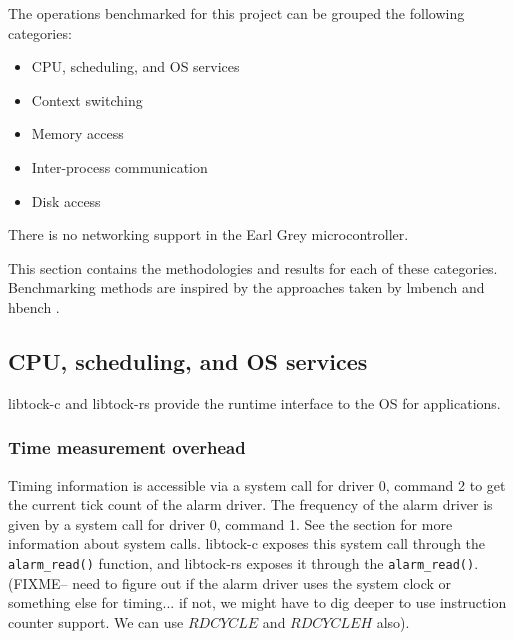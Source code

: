 \documentclass{article}
\begin{document}
The operations benchmarked for this project can be grouped the following categories:

\begin{itemize}
    \item CPU, scheduling, and OS services
    \item Context switching
    \item Memory access
    \item Inter-process communication
    \item Disk access
\end{itemize}

There is no networking support in the Earl Grey microcontroller.

This section contains the methodologies and results for each of these categories. Benchmarking methods are inspired by the approaches taken by lmbench \cite{lmbench} and hbench \cite{hbench}.


\subsection{CPU, scheduling, and OS services}

libtock-c and libtock-rs provide the runtime interface to the OS for applications. 

\subsubsection{Time measurement overhead} \label{subsubsec:time-measurement}

Timing information is accessible via a system call for driver 0, command 2 to get the current tick count of the alarm driver. The frequency of the alarm driver is given by a system call for driver 0, command 1. See the  section for more information about system calls. libtock-c exposes this system call through the \texttt{alarm\_read()} function, and libtock-rs exposes it through the \texttt{alarm\_read()}. (FIXME-- need to figure out if the alarm driver uses the system clock or something else for timing... if not, we might have to dig deeper to use instruction counter support. We can use $RDCYCLE$ and $RDCYCLEH$ also).
\end{document}
